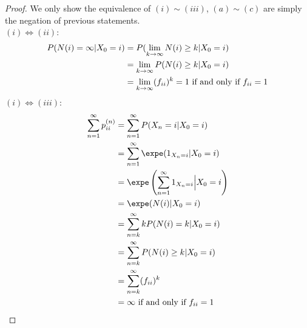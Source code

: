 \documentclass{article}
\begin{document}
    \begin{proof}
    	We only show the equivalence of $(i)\sim(iii)$, $(a)\sim(c)$ are simply the negation of previous statements. \\
    	$(i) \iff (ii)$:
    	\begin{align}
    		P(N(i) = \infty|X_0=i) &= P(\lim_{k \to \infty} N(i) \geq k| X_0=i) \\
    		&= \lim_{k \to \infty} P(N(i) \geq k| X_0=i) \\
    		&= \lim_{k \to \infty} (f_{ii})^k = 1 \text{{ if and only if }} f_{ii} = 1
    	\end{align}
    	$(i) \iff (iii)$:
    	\begin{align}
    		\sum_{n=1}^\infty p_{ii}^{(n)}
    		&= \sum_{n=1}^\infty P(X_n = i | X_0 = i) \\
    		&= \sum_{n=1}^\infty \expe (1_{X_n=i} | X_0 = i) \\
    		&= \expe \left(
    		\sum_{n=1}^\infty 1_{X_n=i} \Big| X_0 = i
    		\right ) \\
    		&= \expe (N(i) | X_0=i) \\
    		&= \sum_{n=k}^\infty k P(N(i)=k | X_0=i) \\
    		&= \sum_{n=k}^\infty P(N(i) \geq k | X_0=i) \\
    		&= \sum_{n=k}^\infty (f_{ii})^k \\
    		&= \infty \tx{ if and only if } f_{ii} = 1
    	\end{align}
    \end{proof}
\end{document}
